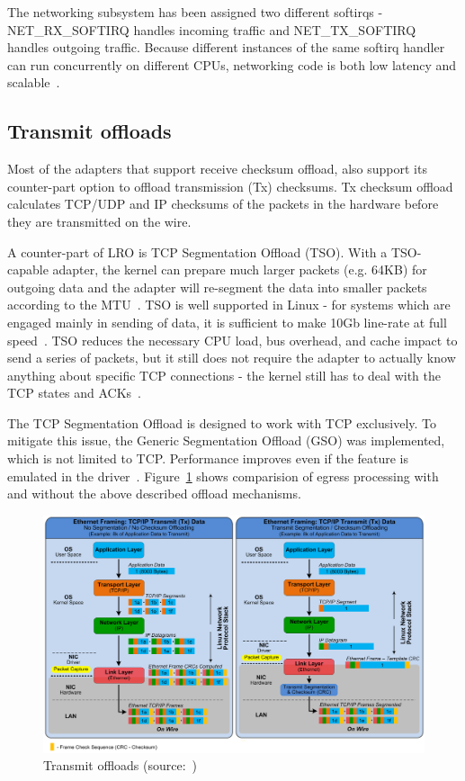 
The networking subsystem has been assigned two different softirqs -
NET\_RX\_SOFTIRQ handles incoming traffic and NET\_TX\_SOFTIRQ handles outgoing traffic.
Because different instances of the same softirq handler can run concurrently on different CPUs,
networking code is both low latency and scalable~\cite{understanding-internals}.

\subsection{Transmit offloads}
Most of the adapters that support receive checksum offload,
also support its counter-part option to offload transmission (Tx) checksums.
Tx checksum offload calculates TCP/UDP and
IP checksums of the packets in the hardware before they are transmitted on the wire.


A counter-part of LRO is TCP Segmentation Offload (TSO).
With a TSO-capable adapter, the kernel can prepare much larger packets (e.g. 64KB)
for outgoing data and the adapter will re-segment the data into smaller packets according to the MTU~\cite{jls2009-gro}.
TSO is well supported in Linux -
for systems which are engaged mainly in sending of data, it is sufficient to make 10Gb line-rate at full speed~\cite{jls2009-gro}.
TSO reduces the necessary CPU load, bus overhead, and cache impact to send a series of packets,
but it still does not require the adapter to actually know
anything about specific TCP connections -
the kernel still has to deal with the TCP states and ACKs~\cite{linux-and-tcp-offload-engines}.

The TCP Segmentation Offload is designed to work with TCP exclusively.
To mitigate this issue, the Generic Segmentation Offload (GSO) was implemented, which is not limited to TCP.
Performance improves even if the feature is emulated in the driver~\cite{jls2009-gro}.
Figure~\ref{fig:linux-tx-offloads} shows comparision of egress processing
with and without the above described offload mechanisms.
\begin{figure}
	\centering
	\includegraphics[width=15cm,keepaspectratio]{fig/tx-offloads.png}
	\caption{Transmit offloads (source:~\cite{nst-offloads})}
	\label{fig:linux-tx-offloads}
	\bigskip
\end{figure}

